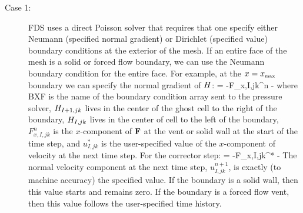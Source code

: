 \begin{description}
\item[Case 1:] FDS uses a direct Poisson solver that requires that one specify either Neumann (specified normal gradient) or Dirichlet (specified value) boundary conditions at the exterior of the mesh. If an entire face of the mesh is a solid or forced flow boundary, we can use the Neumann boundary condition for the entire face. For example, at the $x=x_{\hbox{\tiny max}}$ boundary we can specify the normal gradient of $H$:  \equiv {} = -F_{x,I,jk}^n -  \label{dbc} \ee where {\ct BXF} is the name of the boundary condition array sent to the pressure solver, $H_{I+1,jk}$ lives in the center of the ghost cell to the right of the boundary, $H_{I,jk}$ lives in the center of cell to the left of the boundary, $F_{x,I,jk}^n$ is the $x$-component of ${\mathbf{F}}$ at the vent or solid wall at the start of the time step, and $u_{I,jk}^*$ is the user-specified value of the $x$-component of velocity at the next time step. For the corrector step:  \equiv {} = -F_{x,I,jk}^* -  \label{dbc2} \ee The normal velocity component at the next time step, $u_{I,jk}^{n+1}$, is exactly (to machine accuracy) the specified value. If the boundary is a solid wall, then this value starts and remains zero. If the boundary is a forced flow vent, then this value follows the user-specified time history.


\end{description}
